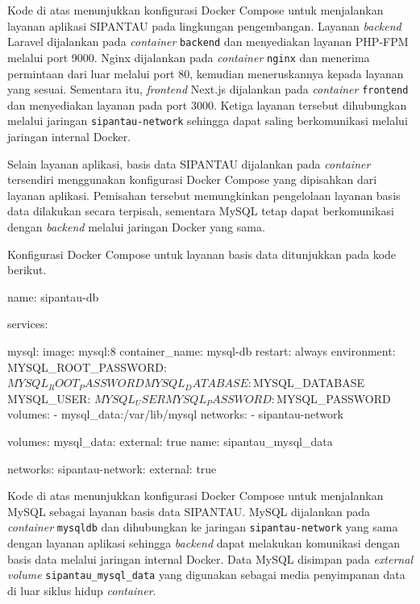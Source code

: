 Kode di atas menunjukkan konfigurasi Docker Compose untuk menjalankan layanan aplikasi SIPANTAU pada lingkungan pengembangan. Layanan \textit{backend} Laravel dijalankan pada \textit{container} \texttt{backend} dan menyediakan layanan PHP-FPM melalui port 9000. Nginx dijalankan pada \textit{container} \texttt{nginx} dan menerima permintaan dari luar melalui port 80, kemudian meneruskannya kepada layanan yang sesuai. Sementara itu, \textit{frontend} Next.js dijalankan pada \textit{container} \texttt{frontend} dan menyediakan layanan pada port 3000. Ketiga layanan tersebut dihubungkan melalui jaringan \texttt{sipantau-network} sehingga dapat saling berkomunikasi melalui jaringan internal Docker.

Selain layanan aplikasi, basis data SIPANTAU dijalankan pada \textit{container} tersendiri menggunakan konfigurasi Docker Compose yang dipisahkan dari layanan aplikasi. Pemisahan tersebut memungkinkan pengelolaan layanan basis data dilakukan secara terpisah, sementara MySQL tetap dapat berkomunikasi dengan \textit{backend} melalui jaringan Docker yang sama.

Konfigurasi Docker Compose untuk layanan basis data ditunjukkan pada kode berikut.

\begin{code}
\begin{ignasicblock}
name: sipantau-db

services:

  mysql:
    image: mysql:8
    container_name: mysql-db
    restart: always
    environment:
      MYSQL_ROOT_PASSWORD: ${MYSQL_ROOT_PASSWORD}
      MYSQL_DATABASE: ${MYSQL_DATABASE}
      MYSQL_USER: ${MYSQL_USER}
      MYSQL_PASSWORD: ${MYSQL_PASSWORD}
    volumes:
      - mysql_data:/var/lib/mysql
    networks:
      - sipantau-network

volumes:
  mysql_data:
    external: true
    name: sipantau_mysql_data

networks:
  sipantau-network:
    external: true
\end{ignasicblock}
\end{code}

Kode di atas menunjukkan konfigurasi Docker Compose untuk menjalankan MySQL sebagai layanan basis data SIPANTAU. MySQL dijalankan pada \textit{container} \texttt{mysql\-db} dan dihubungkan ke jaringan \texttt{sipantau-network} yang sama dengan layanan aplikasi sehingga \textit{backend} dapat melakukan komunikasi dengan basis data melalui jaringan internal Docker. Data MySQL disimpan pada \textit{external volume} \texttt{sipantau\_mysql\_data} yang digunakan sebagai media penyimpanan data di luar siklus hidup \textit{container}.


